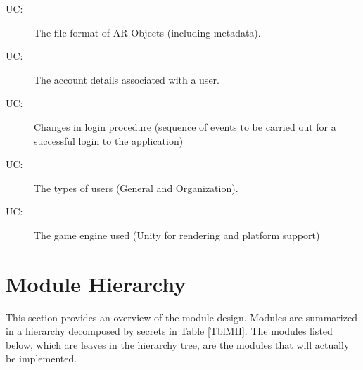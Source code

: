 \documentclass[12pt, titlepage]{article}
\newcounter{ucnum}
\newcommand{\uctheucnum}{UC\theucnum}
\begin{document}
\begin{description}
\item[ \uctheucnum \label{ucFormat}:] The file format of AR Objects (including metadata).
\item[ \uctheucnum \label{ucFormat}:] The account details associated with a user.
\item[ \uctheucnum \label{ucLoginProcedure}:] Changes in login procedure (sequence of events to be carried out for a successful login to the application)
\item[ \uctheucnum \label{ucFormat}:] The types of users (General and Organization).
\item[ \uctheucnum \label{ucEngine}:] The game engine used (Unity for rendering and platform support)
\end{description}

\section{Module Hierarchy} \label{SecMH}

This section provides an overview of the module design. Modules are summarized
in a hierarchy decomposed by secrets in Table \ref{TblMH}. The modules listed
below, which are leaves in the hierarchy tree, are the modules that will
actually be implemented.
\end{document}
